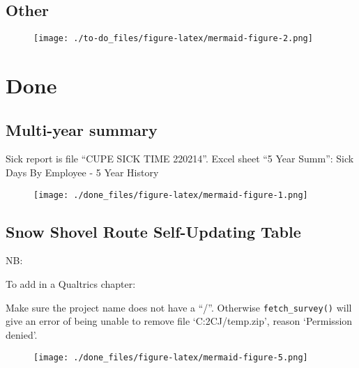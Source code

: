 \documentclass[
  letterpaper,
  DIV=11,
  numbers=noendperiod,
  oneside]{scrreprt}
\begin{document}
\hypertarget{other}{%
\section{Other}\label{other}}

\begin{figure}[H]

{\centering \texttt{[image: ./to-do\_files/figure-latex/mermaid-figure-2.png]}

}

\end{figure}


\hypertarget{done}{%
\chapter{Done}\label{done}}

\hypertarget{multi-year-summary}{%
\section{Multi-year summary}\label{multi-year-summary}}

Sick report is file ``CUPE SICK TIME 220214''. Excel sheet ``5 Year
Summ'': Sick Days By Employee - 5 Year History

\begin{figure}[H]

{\centering \texttt{[image: ./done\_files/figure-latex/mermaid-figure-1.png]}

}

\end{figure}

\hypertarget{snow-shovel-route-self-updating-table}{%
\section{Snow Shovel Route Self-Updating
Table}\label{snow-shovel-route-self-updating-table}}

NB:

To add in a Qualtrics chapter:

Make sure the project name does not have a ``/''. Otherwise
\texttt{fetch\_survey()} will give an error of being unable to remove
file `C:\Users\asadowsk\AppData\Local\Temp\RtmpUbY2CJ/temp.zip', reason
`Permission denied'.

\begin{figure}[H]

{\centering \texttt{[image: ./done\_files/figure-latex/mermaid-figure-5.png]}

}

\end{figure}
\end{document}
